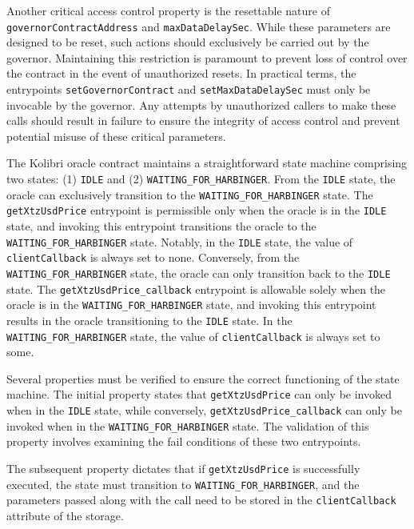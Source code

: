 \documentclass[a4paper,USenglish,cleveref, autoref, thm-restate]{lipics-v2021}
\begin{document}
Another critical access control property is the resettable nature of \lstinline/governorContractAddress/ and \lstinline/maxDataDelaySec/. While these parameters are designed to be reset, such actions should exclusively be carried out by the governor. Maintaining this restriction is paramount to prevent loss of control over the contract in the event of unauthorized resets. In practical terms, the entrypoints \lstinline/setGovernorContract/ and \lstinline/setMaxDataDelaySec/ must only be invocable by the governor. Any attempts by unauthorized callers to make these calls should result in failure to ensure the integrity of access control and prevent potential misuse of these critical parameters.

The Kolibri oracle contract maintains a straightforward state machine comprising two states: (1) \lstinline/IDLE/ and (2) \lstinline/WAITING_FOR_HARBINGER/. From the \lstinline/IDLE/ state, the oracle can exclusively transition to the \lstinline/WAITING_FOR_HARBINGER/ state. The \lstinline/getXtzUsdPrice/ entrypoint is permissible only when the oracle is in the \lstinline/IDLE/ state, and invoking this entrypoint transitions the oracle to the \lstinline/WAITING_FOR_HARBINGER/ state. Notably, in the \lstinline/IDLE/ state, the value of \lstinline/clientCallback/ is always set to none. Conversely, from the \lstinline/WAITING_FOR_HARBINGER/ state, the oracle can only transition back to the \lstinline/IDLE/ state. The \lstinline/getXtzUsdPrice_callback/ entrypoint is allowable solely when the oracle is in the \lstinline/WAITING_FOR_HARBINGER/ state, and invoking this entrypoint results in the oracle transitioning to the \lstinline/IDLE/ state. In the \lstinline/WAITING_FOR_HARBINGER/ state, the value of \lstinline/clientCallback/ is always set to some.

Several properties must be verified to ensure the correct functioning of the state machine. The initial property states that \lstinline/getXtzUsdPrice/ can only be invoked when in the \lstinline/IDLE/ state, while conversely, \lstinline/getXtzUsdPrice_callback/ can only be invoked when in the \lstinline/WAITING_FOR_HARBINGER/ state. The validation of this property involves examining the fail conditions of these two entrypoints.

The subsequent property dictates that if \lstinline/getXtzUsdPrice/ is successfully executed, the state must transition to \lstinline/WAITING_FOR_HARBINGER/, and the parameters passed along with the call need to be stored in the \lstinline/clientCallback/ attribute of the storage.
\end{document}
